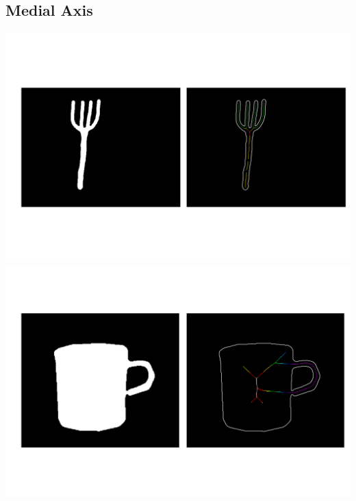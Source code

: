 \documentclass[12pt]{article}
\begin{document}
\subsection{Medial Axis}


\includegraphics[scale=0.25]{fork_75.png}
\includegraphics[scale=0.25]{cup_476.png}

\vspace{12px}
\end{document}

